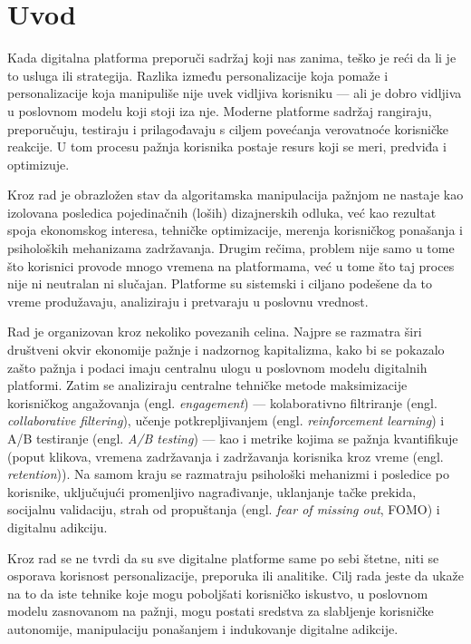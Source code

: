 \section{Uvod}

Kada digitalna platforma preporuči sadržaj koji nas zanima, teško je reći da li je to usluga ili strategija. Razlika između personalizacije koja pomaže i personalizacije koja manipuliše nije uvek vidljiva korisniku — ali je dobro vidljiva u poslovnom modelu koji stoji iza nje. Moderne platforme sadržaj rangiraju, preporučuju, testiraju i prilagođavaju s ciljem povećanja verovatnoće korisničke reakcije. U tom procesu pažnja korisnika postaje resurs koji se meri, predviđa i optimizuje.

Kroz rad je obrazložen stav da algoritamska manipulacija pažnjom ne nastaje kao izolovana posledica pojedinačnih (loših) dizajnerskih odluka, već kao rezultat spoja ekonomskog interesa, tehničke optimizacije, merenja korisničkog ponašanja i psiholoških mehanizama zadržavanja. Drugim rečima, problem nije samo u tome što korisnici provode mnogo vremena na platformama, već u tome što taj proces nije ni neutralan ni slučajan. Platforme su sistemski i ciljano podešene da to vreme produžavaju, analiziraju i pretvaraju u poslovnu vrednost.

Rad je organizovan kroz nekoliko povezanih celina. Najpre se razmatra širi društveni okvir ekonomije pažnje i nadzornog kapitalizma, kako bi se pokazalo zašto pažnja i podaci imaju centralnu ulogu u poslovnom modelu digitalnih platformi. Zatim se analiziraju centralne tehničke metode maksimizacije korisničkog angažovanja (engl. \textit{engagement}) — kolaborativno filtriranje (engl. \textit{collaborative filtering}), učenje potkrepljivanjem (engl. \textit{reinforcement learning}) i A/B testiranje (engl. \textit{A/B testing}) — kao i metrike kojima se pažnja kvantifikuje (poput klikova, vremena zadržavanja i zadržavanja korisnika kroz vreme (engl. \textit{retention})). Na samom kraju se razmatraju psihološki mehanizmi i posledice po korisnike, uključujući promenljivo nagrađivanje, uklanjanje tačke prekida, socijalnu validaciju, strah od propuštanja (engl. \textit{fear of missing out}, FOMO) i digitalnu adikciju.

Kroz rad se ne tvrdi da su sve digitalne platforme same po sebi štetne, niti se osporava korisnost personalizacije, preporuka ili analitike. Cilj rada jeste da ukaže na to da iste tehnike koje mogu poboljšati korisničko iskustvo, u poslovnom modelu zasnovanom na pažnji, mogu postati sredstva za slabljenje korisničke autonomije, manipulaciju ponašanjem i indukovanje digitalne adikcije.